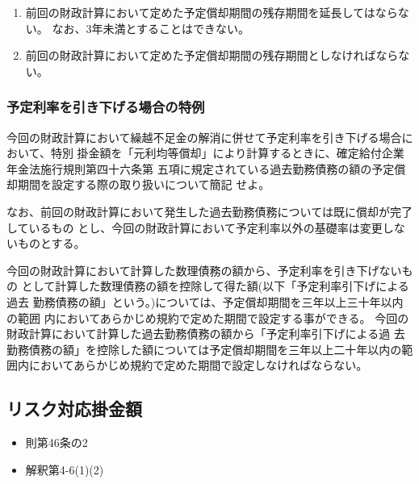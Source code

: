 \begin{answerbox}
  \begin{enumerate}[(1)]
    \item 前回の財政計算において定めた予定償却期間の残存期間を延長してはならない。 なお、3年未満とすることはできない。
    \item 前回の財政計算において定めた予定償却期間の残存期間としなければならない。
  \end{enumerate}
\end{answerbox}

\newpage


\subsubsection{予定利率を引き下げる場合の特例}

\begin{shortanswer}[数理人試験 H27 問題3 設問3]
  今回の財政計算において繰越不足金の解消に併せて予定利率を引き下げる場合において、特別
  掛金額を「元利均等償却」により計算するときに、確定給付企業年金法施行規則第四十六条第
  五項に規定されている過去勤務債務の額の予定償却期間を設定する際の取り扱いについて簡記
  せよ。 
  
  なお、前回の財政計算において発生した過去勤務債務については既に償却が完了しているもの
  とし、今回の財政計算において予定利率以外の基礎率は変更しないものとする。
\end{shortanswer}

\begin{answerbox}
  今回の財政計算において計算した数理債務の額から、予定利率を引き下げないもの
として計算した数理債務の額を控除して得た額(以下「予定利率引下げによる過去
勤務債務の額」という。)については、予定償却期間を三年以上三十年以内の範囲
内においてあらかじめ規約で定めた期間で設定する事ができる。
今回の財政計算において計算した過去勤務債務の額から「予定利率引下げによる過
去勤務債務の額」を控除した額については予定償却期間を三年以上二十年以内の範
囲内においてあらかじめ規約で定めた期間で設定しなければならない。
\end{answerbox}


\newpage

\subsection{リスク対応掛金額}


\begin{InyouJobunbox}
  \begin{itemize}
    \item 則第46条の2
    \item 解釈第4-6(1)(2)
  \end{itemize}
\end{InyouJobunbox}

